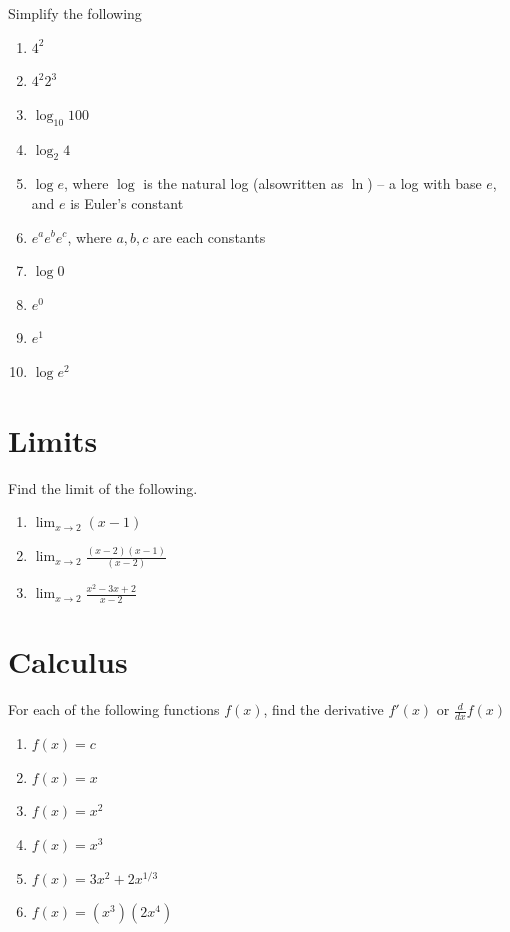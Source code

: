 \documentclass[]{book}
\providecommand{\tightlist}{%
  \setlength{\itemsep}{0pt}\setlength{\parskip}{0pt}}
\theoremstyle{definition}
\theoremstyle{definition}
\theoremstyle{definition}
\theoremstyle{remark}
\begin{document}
Simplify the following

\begin{enumerate}
\def\labelenumi{\arabic{enumi}.}
\tightlist
\item
  \(4^2\)
\item
  \(4^2 2^3\)
\item
  \(\log_{10}100\)
\item
  \(\log_{2}4\)
\item
  \(\log e\), where \(\log\) is the natural log (alsowritten as \(\ln\))
  -- a log with base \(e\), and \(e\) is Euler's constant
\item
  \(e^a e^b e^c\), where \(a, b, c\) are each constants
\item
  \(\log 0\)
\item
  \(e^0\)
\item
  \(e^1\)
\item
  \(\log e^2\)
\end{enumerate}

\section{Limits}\label{limits}

Find the limit of the following.

\begin{enumerate}
\def\labelenumi{\arabic{enumi}.}
\tightlist
\item
  \(\lim_{x \to 2} (x - 1)\)
\item
  \(\lim_{x \to 2} \frac{(x - 2) (x - 1)}{(x - 2)}\)
\item
  \(\lim_{x \to 2}\frac{x^2 - 3x + 2}{x- 2}\)
\end{enumerate}

\section{Calculus}\label{calculus}

For each of the following functions \(f(x)\), find the derivative
\(f'(x)\) or \(\frac{d}{dx}f(x)\)

\begin{enumerate}
\def\labelenumi{\arabic{enumi}.}
\tightlist
\item
  \(f(x)=c\)
\item
  \(f(x)=x\)
\item
  \(f(x)=x^2\)
\item
  \(f(x)=x^3\)
\item
  \(f(x)=3x^2+2x^{1/3}\)
\item
  \(f(x)=(x^3)(2x^4)\)
\end{enumerate}
\end{document}
